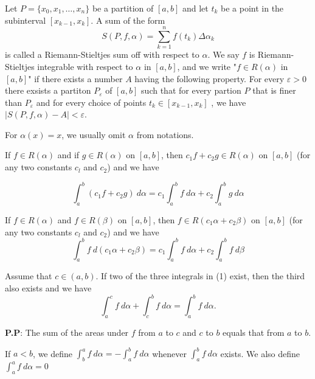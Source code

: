 \documentclass[10pt,a4paper]{book}
\begin{document}
\begin{deff}
Let $P = \{x_0, x_1, \dots , x_n\}$ be a partition of $[a, b]$ and let $t_k$ be a point in the subinterval $[x_{k-1}, x_k]$. A sum of the form
$$S(P,f, \alpha) = \sum_{k = 1}^{n} f(t_k) \Delta \alpha_k$$
is called a Riemann-Stieltjes sum off with respect to $\alpha$. We say $f$ is Riemann-Stieltjes integrable with respect to $\alpha$ in $[a,b]$, and we write "$f \in R(\alpha)$ in $[a,b]$" if there exists a number $A$ having the following property. For every $\varepsilon > 0$ there exsists a partiton $P_{\varepsilon}$ of $[a,b]$ such that for every partion $P$ that is finer than $P_{\varepsilon}$ and for every choice of points $t_k \in [x_{k-1}, x_k]$ , we have $  |S(P,f,\alpha) - A| < \varepsilon$.
\end{deff}

For $\alpha(x) = x$, we usually omit $\alpha$ from notations.

\begin{Thm}
If $f \in R(\alpha)$ and if $g \in R(\alpha)$ on $[a, b]$, then $c_1 f + c_2g \in R(\alpha)$ on
$[a, b]$ (for any two constants $c_l$ and $c_2$) and we have 

$$\int_{a}^{b} (c_1 f + c_2g)\ d\alpha  = c_1 \int_{a}^{b} f \ d\alpha + c_2 \int_{a}^{b} g \ d\alpha$$
\end{Thm}


\begin{Thm}
If $f \in R(\alpha)$ and $f \in R(\beta)$ on $[a, b]$, then $f \in R(c_1\alpha + c_2\beta)$ on $[a, b]$ (for any two constants $c_l$ and $c_2$) and we have
$$\int_{a}^{b} f\ d(c_1 \alpha + c_2 \beta) = c_1\int_{a}^{b} f \ d\alpha + c_2\int_{a}^{b}f \ d\beta $$
\end{Thm}

\begin{Thm}
Assume that $c \in (a, b)$. If two of the three integrals in (1) exist, then the third also exists and we have
    $$\int_{a}^{c} f \ d\alpha + \int_{c}^{b} f \ d\alpha = \int_{a}^{b} f \ d\alpha   .$$


\end{Thm}
\noindent \textbf{P.P}: The sum of the areas under $f$ from $a$ to $c$ and $c$ to $b$ equals that from $a$ to $b$.

\begin{deff}
 If $a < b$, we define $\int_{b}^{a} f \ d\alpha = - \int_{a}^{b} f \ d\alpha$ whenever $\int_{a}^{b} f \ d\alpha$  exists. We also define $\int_{a}^{a} f \ d\alpha = 0$
\end{deff}
\end{document}
